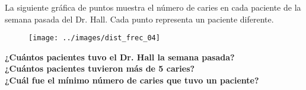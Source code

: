 \question[10] La siguiente gráfica de puntos muestra el número de caries en cada paciente de la semana pasada del Dr. Hall. Cada punto representa un paciente diferente.
\begin{figure}[H]
    \begin{center}
        \texttt{[image: ../images/dist\_frec\_04]}
    \end{center}
    \caption{}
    \label{fig:dist_frec_04}
\end{figure}
\textbf{¿Cuántos pacientes tuvo el Dr. Hall la semana pasada?}\\
\textbf{¿Cuántos pacientes tuvieron más de 5 caries?}\\
\textbf{¿Cuál fue el mínimo número de caries que tuvo un paciente?}